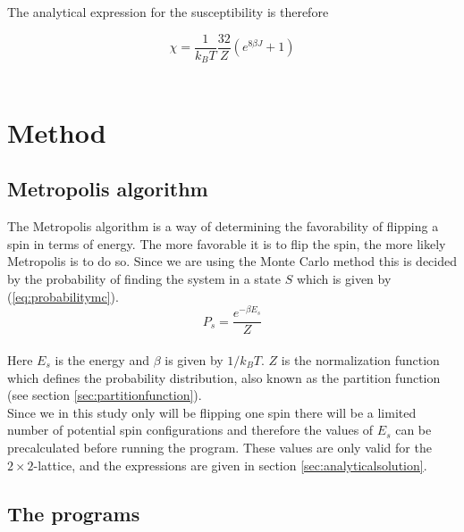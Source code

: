 \documentclass{article}
\begin{document}
The analytical expression for the susceptibility is therefore

\begin{equation}    \label{eq:finalsusceptibility}
    \chi = \frac{1}{k_B T} \frac{32}{Z} \left( e^{8 \beta J} + 1 \right)
\end{equation} \\




\vspace{1cm}

\section{Method} \label{sec:Method}

\subsection{Metropolis algorithm} \label{sec:metropolis}

The Metropolis algorithm is a way of determining the favorability of flipping a spin in terms of energy. The more favorable it is to flip the spin, the more likely Metropolis is to do so. Since we are using the Monte Carlo method this is decided by the probability of finding the system in a state $S$ which is given by (\ref{eq:probabilitymc}). \\

\begin{equation} \label{eq:probabilitymc}
    P_s = \frac{e^{-\beta E_s}}{Z}
\end{equation} \\

Here $E_s$ is the energy and $\beta$ is given by $1/k_B T$. $Z$ is the normalization function which defines the probability distribution, also known as the partition function (see section \ref{sec:partitionfunction}). \\

Since we in this study only will be flipping one spin there will be a limited number of potential spin configurations and therefore the values of $E_s$ can be precalculated before running the program. These values are only valid for the $2 \times 2$-lattice, and the expressions are given in section \ref{sec:analyticalsolution}.   \\


\subsection{The programs} \label{sec:programs}
\end{document}
